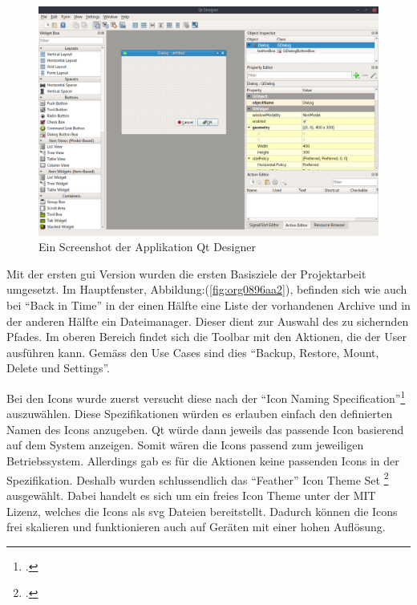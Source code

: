 \begin{figure}[htbp]
\centering
\includegraphics[width=.9\linewidth]{pictures/qt_designer.png}
\caption{\label{fig:org81e712c}
Ein Screenshot der Applikation Qt Designer}
\end{figure}
Mit der ersten \gls{gui} Version wurden die ersten Basisziele der Projektarbeit
umgesetzt. Im Hauptfenster, Abbildung:(\ref{fig:org0896aa2}), befinden sich wie
auch bei "`Back in Time"' in der einen Hälfte eine Liste der vorhandenen Archive
und in der anderen Hälfte ein Dateimanager. Dieser dient zur Auswahl des zu
sichernden Pfades. Im oberen Bereich findet sich die Toolbar mit den Aktionen,
die der User ausführen kann. Gemäss den Use Cases sind dies "`Backup,
Restore, Mount, Delete und Settings"'.

Bei den Icons wurde zuerst versucht diese nach der "`Icon Naming
Specification"'\footcite{iconnamespec} auszuwählen. Diese Spezifikationen würden
es erlauben einfach den definierten Namen des Icons anzugeben. Qt würde dann
jeweils das passende Icon basierend auf dem System anzeigen. Somit wären die
Icons passend zum jeweiligen Betriebssystem. Allerdings gab es für die Aktionen
keine passenden Icons in der Spezifikation. Deshalb wurden schlussendlich das
"`Feather"' Icon Theme Set \footcite{feathericons} ausgewählt. Dabei handelt es
sich um ein freies Icon Theme unter der MIT Lizenz, welches die Icons als \gls{svg}
Dateien bereitstellt. Dadurch können die Icons frei skalieren und
funktionieren auch auf Geräten mit einer hohen Auflösung.

